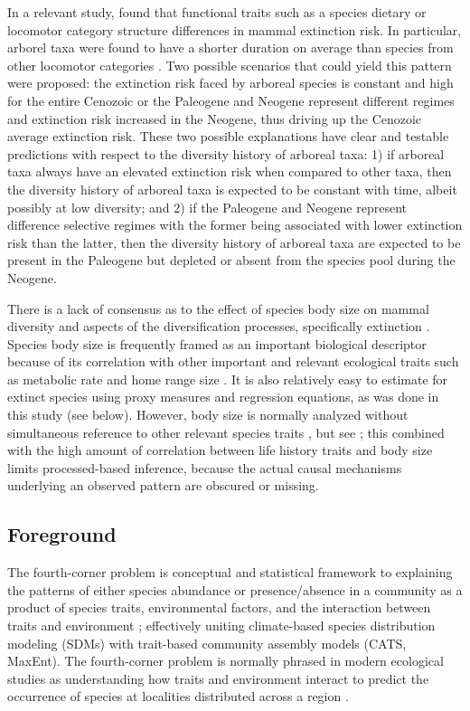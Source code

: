 \documentclass[12pt,letterpaper]{article}
\begin{document}
In a relevant study, \citet{Smits2015b} found that functional traits such as a species dietary or locomotor category structure differences in mammal extinction risk. In particular, arborel taxa were found to have a shorter duration on average than species from other locomotor categories \citep{Smits2015b}. Two possible scenarios that could yield this pattern were proposed: the extinction risk faced by arboreal species is constant and high for the entire Cenozoic or the Paleogene and Neogene represent different regimes and extinction risk increased in the Neogene, thus driving up the Cenozoic average extinction risk. These two possible explanations have clear and testable predictions with respect to the diversity history of arboreal taxa: 1) if arboreal taxa always have an elevated extinction risk when compared to other taxa, then the diversity history of arboreal taxa is expected to be constant with time, albeit possibly at low diversity; and 2) if the Paleogene and Neogene represent difference selective regimes with the former being associated with lower extinction risk than the latter, then the diversity history of arboreal taxa are expected to be present in the Paleogene but depleted or absent from the species pool during the Neogene.

There is a lack of consensus as to the effect of species body size on mammal diversity and aspects of the diversification processes, specifically extinction \citep{Liow2008,Liow2009,Tomiya2013,Smits2015b}. Species body size is frequently framed as an important biological descriptor because of its correlation with other important and relevant ecological traits such as metabolic rate and home range size \citep{Brown1995}. It is also relatively easy to estimate for extinct species using proxy measures and regression equations, as was done in this study (see below). However, body size is normally analyzed without simultaneous reference to other relevant species traits \citep{Liow2008,Huang2017,Raia2012f,Smith2004}, but see \citep{Smits2015b}; this combined with the high amount of correlation between life history traits and body size limits processed-based inference, because the actual causal mechanisms underlying an observed pattern are obscured or missing.




\subsection*{Foreground}

The fourth-corner problem is conceptual and statistical framework to explaining the patterns of either species abundance or presence/absence in a community as a product of species traits, environmental factors, and the interaction between traits and environment \citep{Brown2014c,Warton2015a,Pollock2012,Jamil2013}; effectively uniting climate-based species distribution modeling (SDMs) with trait-based community assembly models (CATS, MaxEnt). The fourth-corner problem is normally phrased in modern ecological studies as understanding how traits and environment interact to predict the occurrence of species at localities distributed across a region \citep{Pollock2012,Jamil2013}. 
\end{document}
